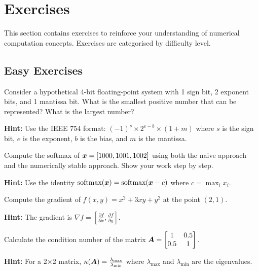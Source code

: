 






\section{Exercises}
\label{sec:problems}

This section contains exercises to reinforce your understanding of numerical computation concepts. Exercises are categorised by difficulty level.

\subsection{Easy Exercises}

\begin{problem}
\label{prob:float-basics}
Consider a hypothetical 4-bit floating-point system with 1 sign bit, 2 exponent bits, and 1 mantissa bit. What is the smallest positive number that can be represented? What is the largest number?

\textbf{Hint:} Use the IEEE 754 format: $(-1)^s \times 2^{e-b} \times (1 + m)$ where $s$ is the sign bit, $e$ is the exponent, $b$ is the bias, and $m$ is the mantissa.
\end{problem}

\begin{problem}
\label{prob:softmax-stability}
Compute the softmax of $\boldsymbol{x} = [1000, 1001, 1002]$ using both the naive approach and the numerically stable approach. Show your work step by step.

\textbf{Hint:} Use the identity $\text{softmax}(\boldsymbol{x}) = \text{softmax}(\boldsymbol{x} - c)$ where $c = \max_i x_i$.
\end{problem}

\begin{problem}
\label{prob:gradient-computation}
Compute the gradient of $f(x, y) = x^2 + 3xy + y^2$ at the point $(2, 1)$.

\textbf{Hint:} The gradient is $\nabla f = \left[\frac{\partial f}{\partial x}, \frac{\partial f}{\partial y}\right]$.
\end{problem}

\begin{problem}
\label{prob:condition-number}
Calculate the condition number of the matrix $\boldsymbol{A} = \begin{bmatrix} 1 & 0.5 \\ 0.5 & 1 \end{bmatrix}$.

\textbf{Hint:} For a 2×2 matrix, $\kappa(\boldsymbol{A}) = \frac{\lambda_{\max}}{\lambda_{\min}}$ where $\lambda_{\max}$ and $\lambda_{\min}$ are the eigenvalues.
\end{problem}

